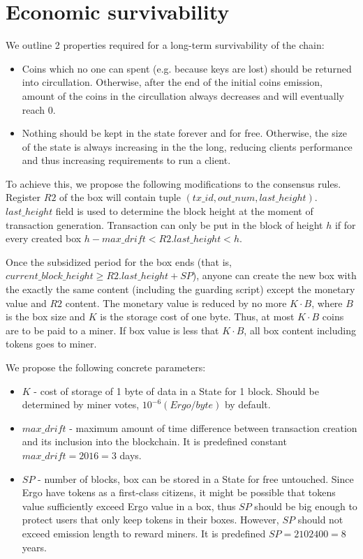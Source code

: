 \section{Economic survivability}

We outline 2 properties required for a long-term survivability of the chain:

\begin{itemize}
    \item{} Coins which no one can spent (e.g. because keys are lost)
    should be returned into circullation. Otherwise, after the end of the initial coins emission, amount of the coins
    in the circullation always decreases and will eventually reach 0.
    \item{} Nothing should be kept in the state forever and for free.
    Otherwise, the size of the state is always increasing in the the long, reducing clients performance
    and thus increasing requirements to run a client.
\end{itemize}

To achieve this, we propose the following modifications to the consensus rules.
Register $R2$ of the box will contain tuple $(tx\_id, out\_num,
last\_height)$. $last\_height$ field is used to determine the block height
at the moment of transaction generation. Transaction can only be put in the
block of height $h$ if for every created box $h - max\_drift < R2.last\_height < h$.

Once the subsidized period for the box ends (that is,
$current\_block\_height \ge R2.last\_height + SP$), anyone can
create the new box with the exactly the same content (including the guarding
script) except the monetary value and $R2$ content. The monetary value is
reduced by no more $K \cdot B$, where $B$ is the box size and $K$ is the storage cost of one byte.
Thus, at most $K \cdot B$ coins are to be paid to a miner.
If box value is less that $K \cdot B$, all box content including tokens goes to miner.


We propose the following concrete parameters:
\begin{itemize}
    \item{} $K$ - cost of storage of 1 byte of data in a State for 1 block.
    Should be determined by miner votes, $10^{-6} (Ergo/byte)$ by default.
    \item{} $max\_drift$ - maximum amount of time difference between transaction
    creation and its inclusion into the blockchain.
    It is predefined constant $max\_drift = 2016 = 3$ days.
    \item{} $SP$ - number of blocks, box can be stored in a State for free untouched.
    Since Ergo have tokens as a first-class citizens, it might be possible that tokens value
    sufficiently exceed Ergo value in a box, thus $SP$ should be big enough to protect users
    that only keep tokens in their boxes.
    However, $SP$ should not exceed emission length to reward miners.
    It is predefined $SP = 2102400 = 8$ years.
\end{itemize}